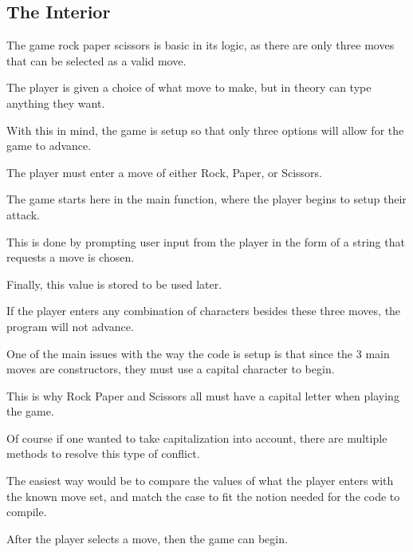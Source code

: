 \documentclass{article}
\begin{document}
\medskip\medskip
\begin{lstlisting}
\end{lstlisting}

\medskip

\subsection{The Interior}
\medskip\medskip
\hspace{\parindent} 

\medskip\noindent
The game rock paper scissors is basic in its logic, as there are only three moves that can be selected as a valid move.

\medskip\noindent
The player is given a choice of what move to make, but in theory can type anything they want. 

\medskip\noindent
With this in mind, the game is setup so that only three options will allow for the game to advance.

\medskip\noindent
The player must enter a move of either Rock, Paper, or Scissors.

\medskip\noindent
The game starts here in the main function, where the player begins to setup their attack.

\medskip\noindent
This is done by prompting user input from the player in the form of a string that requests a move is chosen. 

\medskip\noindent
Finally, this value is stored to be used later.

\medskip\noindent
If the player enters any combination of characters besides these three moves, the program will not advance. 

\medskip\noindent
One of the main issues with the way the code is setup is that since the 3 main moves are constructors, they must use a capital character to begin. 

\medskip\noindent
This is why Rock Paper and Scissors all must have a capital letter when playing the game.

\medskip\noindent
Of course if one wanted to take capitalization into account, there are multiple methods to resolve this type of conflict. 

\medskip\noindent
The easiest way would be to compare the values of what the player enters with the known move set, and match the case to fit the notion needed for the code to compile. 

\medskip\noindent
After the player selects a move, then the game can begin.
\end{document}
